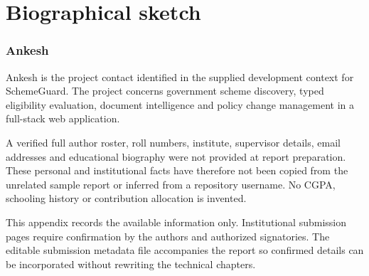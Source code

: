 \documentclass[12pt,a4paper,twoside]{report}
\begin{document}
\clearpage\chapter{Biographical sketch}

\subsection*{Ankesh}

Ankesh is the project contact identified in the supplied development context for SchemeGuard. The project concerns government scheme discovery, typed eligibility evaluation, document intelligence and policy change management in a full-stack web application.

A verified full author roster, roll numbers, institute, supervisor details, email addresses and educational biography were not provided at report preparation. These personal and institutional facts have therefore not been copied from the unrelated sample report or inferred from a repository username. No CGPA, schooling history or contribution allocation is invented.

This appendix records the available information only. Institutional submission pages require confirmation by the authors and authorized signatories. The editable submission metadata file accompanies the report so confirmed details can be incorporated without rewriting the technical chapters.
\end{document}

